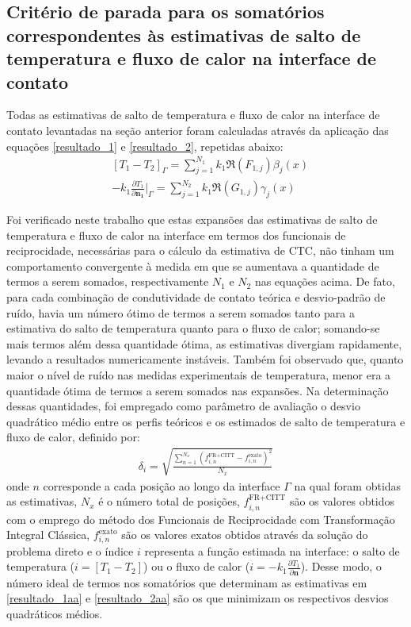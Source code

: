 \subsection{Critério de parada para os somatórios correspondentes às estimativas de salto de temperatura e fluxo de calor na interface de contato}

Todas as estimativas de salto de temperatura e fluxo de calor na interface de contato levantadas na seção anterior foram calculadas através da aplicação das equações \eqref{resultado_1} e \eqref{resultado_2}, repetidas abaixo:
\begin{align}
& [T_1 - T_2]_\Gamma = \sum_{j=1}^{N_1} k_1 \Re(F_{1,j}) \beta_j(x)\label{resultado_1aa}  \\
& - k_1 \frac{\partial T_1}{\partial\mathbf{n_1}}\bigg|_\Gamma = \sum_{j=1}^{N_2} k_1 \Re(G_{1,j}) \gamma_j(x)\label{resultado_2aa}
\end{align}

Foi verificado neste trabalho que estas expansões das estimativas de salto de temperatura e fluxo de calor na interface em termos dos funcionais de reciprocidade, necessárias para o cálculo da estimativa de CTC, não tinham um comportamento convergente à medida em que se aumentava a quantidade de termos a serem somados, respectivamente $N_1$ e $N_2$ nas equações acima. De fato, para cada combinação de condutividade de contato teórica e desvio-padrão de ruído, havia um número ótimo de termos a serem somados tanto para a estimativa do salto de temperatura quanto para o fluxo de calor; somando-se mais termos além dessa quantidade ótima, as estimativas divergiam rapidamente, levando a resultados numericamente instáveis. Também foi observado que, quanto maior o nível de ruído nas medidas experimentais de temperatura, menor era a quantidade ótima de termos a serem somados nas expansões. Na determinação dessas quantidades, foi empregado como parâmetro de avaliação o desvio quadrático médio entre os perfis teóricos e os estimados de salto de temperatura e fluxo de calor, definido por:
\begin{align}
\delta_i = \sqrt{\frac{\sum_{n=1}^{N_x} \left(f^{\text{FR}+\text{CITT}}_{i,n} - f_{i,n}^{\text{exato}}\right)^2 }{N_x}}
\end{align}
onde $n$ corresponde a cada posição ao longo da interface $\Gamma$ na qual foram obtidas as estimativas, $N_x$ é o número total de posições, $f^{\text{FR}+\text{CITT}}_{i,n}$ são os valores obtidos com o emprego do método dos Funcionais de Reciprocidade com Transformação Integral Clássica, $f_{i,n}^{\text{exato}}$ são os valores exatos obtidos através da solução do problema direto e o índice $i$ representa a função estimada na interface: o salto de temperatura ($i = [T_1 - T_2]$) ou o fluxo de calor ($i = -k_1 \frac{\partial T_1}{\partial \mathbf{n}}$). Desse modo, o número ideal de termos nos somatórios que determinam as estimativas em \eqref{resultado_1aa} e \eqref{resultado_2aa} são os que minimizam os respectivos desvios quadráticos médios.

